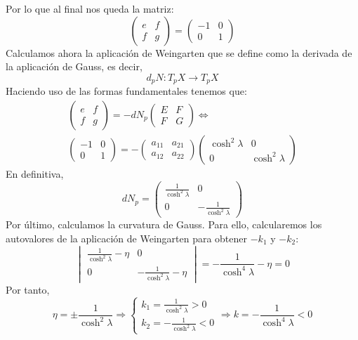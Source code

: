 Por lo que al final nos queda la matriz:
\[
    \begin{pmatrix} e & f\\ f & g \end{pmatrix} = \begin{pmatrix} -1 & 0\\ 0 &
1 \end{pmatrix}
\]
Calculamos ahora la aplicación de Weingarten que se define como la derivada de
la aplicación de Gauss, es decir,
\[
d_p N: T_p X \rightarrow T_p X
\]
Haciendo uso de las formas fundamentales tenemos que:
\begin{gather*}
    \begin{pmatrix} e & f\\ f & g \end{pmatrix} = -dN_p \begin{pmatrix} E & F\\
F & G\end{pmatrix} \Leftrightarrow\\
    \begin{pmatrix} -1 & 0\\ 0 & 1 \end{pmatrix} = -\begin{pmatrix} 
    a_{11} & a_{21}\\ a_{12} & a_{22} \end{pmatrix}
    \begin{pmatrix} \cosh^2 \lambda & 0\\ 0 & \cosh^2 \lambda\end{pmatrix}
\end{gather*}
En definitiva,
\[
    dN_p = \begin{pmatrix} \frac{1}{\cosh^2 \lambda} & 0\\
    0 & -\frac{1}{\cosh^2 \lambda}\end{pmatrix}
\]
Por último, calculamos la curvatura de Gauss. Para ello, calcularemos los
autovalores de la aplicación de Weingarten para obtener $-k_1$ y $-k_2$:
\[
    \begin{vmatrix} \frac{1}{\cosh^2 \lambda} - \eta & 0\\
    0 & -\frac{1}{\cosh^2 \lambda} - \eta \end{vmatrix} = -\frac{1}{\cosh^4
    \lambda} - \eta = 0
\]
Por tanto,
\[
\eta = \pm \frac{1}{\cosh^2 \lambda} \Rightarrow \begin{cases}
    k_1 = \frac{1}{\cosh^2 \lambda} > 0\\
    k_2 = -\frac{1}{\cosh^2 \lambda} < 0
\end{cases} \Rightarrow \boxed{k = - \frac{1}{\cosh^4 \lambda} < 0}
\]
